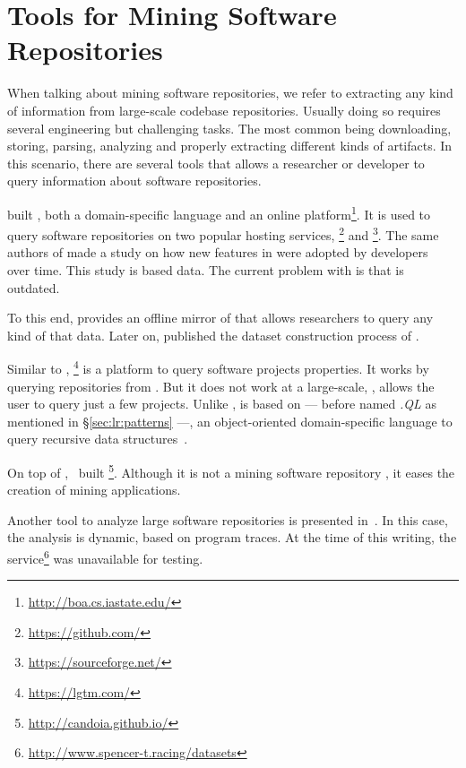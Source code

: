 \section{Tools for Mining Software Repositories}
\label{sec:lr:mining}

When talking about mining software repositories, we refer to extracting any kind of information from large-scale codebase repositories. 
Usually doing so requires several engineering but challenging tasks.
The most common being downloading, storing, parsing, analyzing and properly extracting different kinds of artifacts.
In this scenario, there are several tools that allows a researcher or developer to query information about software repositories.

\cite{dyerBoaLanguageInfrastructure2013,dyerDeclarativeVisitorsEase2013} built \boa{}, both a domain-specific language and an online platform\footnote{\url{http://boa.cs.iastate.edu/}}. 
It is used to query software repositories on two popular hosting services, \github \footnote{\url{https://github.com/}} and \sourceforge \footnote{\url{https://sourceforge.net/}}.
The same authors of \boa{} made a study on how new features in \java{} were adopted by developers~\cite{dyerMiningBillionsAST2014} over time.
This study is based \sourceforge{} data.
The current problem with \sourceforge{} is that is outdated.

To this end, \cite{gousiosGHTorentDatasetTool2013} provides an offline mirror of \github{} that allows researchers to query any kind of that data.
Later on, \cite{gousiosLeanGHTorrentGitHub2014} published the dataset construction process of \github{}.

Similar to \boa{}, \lgtm{}\footnote{\url{https://lgtm.com/}} is a platform to query software projects properties.
It works by querying repositories from \github{}.
But it does not work at a large-scale, \ie{}, \lgtm{} allows the user to query just a few projects.
Unlike \boa{}, \lgtm{} is based on \ql{} --- before named \emph{.QL} as mentioned in \S\ref{sec:lr:patterns} ---, an object-oriented domain-specific language to query recursive data structures~\cite{avgustinovQLObjectorientedQueries2016}.

On top of \boa{},~\cite{tiwariCandoiaPlatformBuilding2017} built \candoia \footnote{\url{http://candoia.github.io/}}. 
Although it is not a mining software repository \perse{}, it eases the creation of mining applications. 

Another tool to analyze large software repositories is presented in~\cite{brandauerSpencerInteractiveHeap2017}.
In this case, the analysis is dynamic, based on program traces. 
At the time of this writing, the service\footnote{\url{http://www.spencer-t.racing/datasets}} was unavailable for testing. 


